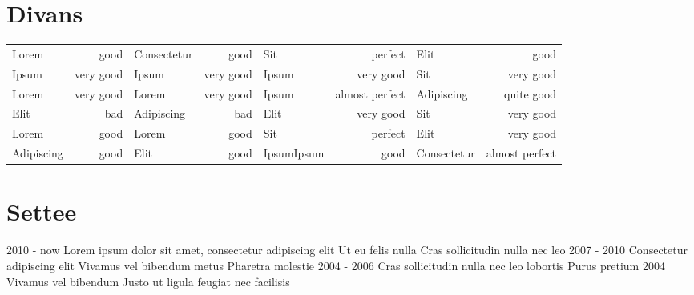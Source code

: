 \documentclass[]{viccuad-cv}
\begin{document}
\framebreak


\section{Divans}
\providecommand{\tabularnewline}{\\}
\setlength{\tabcolsep}{5pt}
    \begin{tabularx}{\linewidth}{X r | X r | X r | X r}
       Lorem       &  good & Consectetur       &  good & Sit      &  perfect &  Elit   &  good\tabularnewline
       Ipsum    &  very good & Ipsum    &  very good & Ipsum      &  very good & Sit            &  very good\tabularnewline
       Lorem     &  very good & Lorem     &  very good & Ipsum      &  almost perfect & Adipiscing               &  quite good\tabularnewline
       Elit  &  bad & Adipiscing  &  bad & Elit     &  very good & Sit       &  very good\tabularnewline
       Lorem &  good & Lorem &  good & Sit         &  perfect & Elit          &  very good\tabularnewline
       Adipiscing  &  good & Elit &  good & IpsumIpsum &  good & Consectetur                  &  almost perfect\tabularnewline
    \end{tabularx}

\framebreak



\section{Settee}
    \begin{entrylistdated}
      \entrydated
        {2010 - now}
        {Lorem ipsum dolor sit amet, consectetur adipiscing elit}
        {Ut eu felis nulla}
        {Cras sollicitudin nulla nec leo}
      \entrydated
        {2007 - 2010}
        {Consectetur adipiscing elit}
        {Vivamus vel bibendum metus}
        {Pharetra molestie}
      \entrydated
        {2004 - 2006}
        {Cras sollicitudin nulla nec leo lobortis}
        {}
        {Purus pretium}
      \entrydated
        {2004}
        {Vivamus vel bibendum}
        {Justo ut ligula feugiat nec facilisis}
        {}
    \end{entrylistdated}
\end{document}
